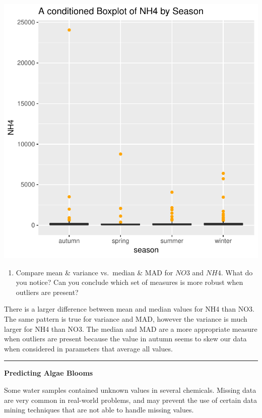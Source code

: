\documentclass[]{article}
\providecommand{\tightlist}{%
  \setlength{\itemsep}{0pt}\setlength{\parskip}{0pt}}
\begin{document}
\begin{center}\includegraphics{homework1-handout_files/figure-latex/unnamed-chunk-3-2} \end{center}

\begin{enumerate}
\tightlist
\item
  Compare mean \& variance vs.~median \& MAD for \(NO3\) and \(NH4\).
  What do you notice? Can you conclude which set of measures is more
  robust when outliers are present?
\end{enumerate}

There is a larger difference between mean and median values for NH4 than
NO3. The same pattern is true for variance and MAD, however the variance
is much larger for NH4 than NO3. The median and MAD are a more
appropriate measure when outliers are present because the value in
autumn seems to skew our data when considered in parameters that average
all values.

\begin{center}\rule{0.5\linewidth}{\linethickness}\end{center}

\textbf{Predicting Algae Blooms}

Some water samples contained unknown values in several chemicals.
Missing data are very common in real-world problems, and may prevent the
use of certain data mining techniques that are not able to handle
missing values.
\end{document}
